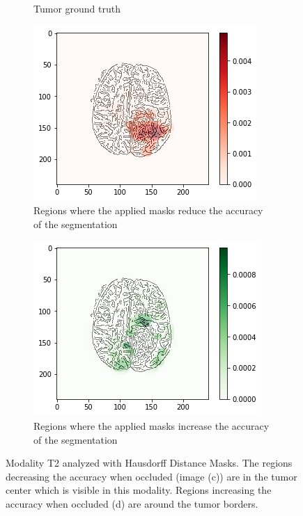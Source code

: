 \begin{figure}[H]
\begin{subfigure}[t]{.4\textwidth}
        \caption{Tumor ground truth}
    \end{subfigure}
    \begin{subfigure}[t]{.45\textwidth}
        \centering
        \includegraphics[width=\linewidth]{chapters/06_hdm/b_Brats18_TCIA08_242_1_L2/33.png}
        \caption{Regions where the applied masks reduce the accuracy of the segmentation}
    \end{subfigure}\hspace{1cm}%
    \begin{subfigure}[t]{.45\textwidth}
        \centering
        \includegraphics[width=\linewidth]{chapters/06_hdm/b_Brats18_TCIA08_242_1_L2/34.png}
        \caption{Regions where the applied masks increase the accuracy of the segmentation}
    \end{subfigure}
    \caption{Modality T2 analyzed with Hausdorff Distance Masks. The regions decreasing the accuracy when occluded (image (c)) are in the tumor center which is visible in this modality. Regions increasing the accuracy when occluded (d) are around the tumor borders.}
    \label{brats_tcia08_t2}
\end{figure}

